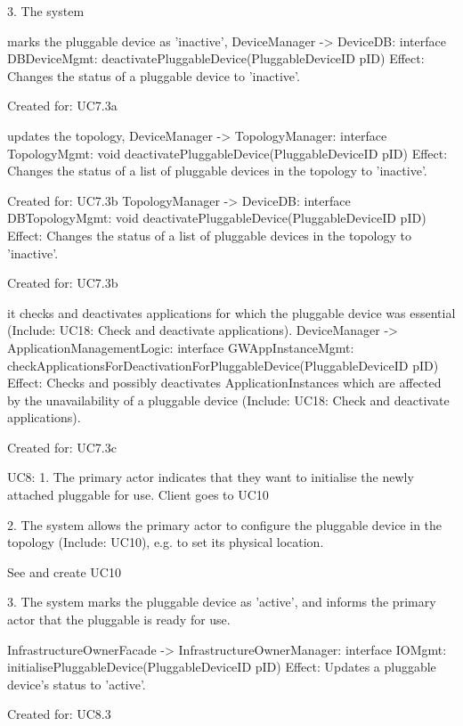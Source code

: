         3. The system
           { marks the pluggable device as 'inactive',
            DeviceManager -> DeviceDB: interface DBDeviceMgmt: deactivatePluggableDevice(PluggableDeviceID pID)
                Effect: Changes the status of a pluggable device to 'inactive'.
                \item Created for: UC7.3a

           { updates the topology,
            DeviceManager -> TopologyManager: interface TopologyMgmt: void deactivatePluggableDevice(PluggableDeviceID pID)
                Effect: Changes the status of a list of pluggable devices in the topology to 'inactive'.
                \item Created for: UC7.3b
            TopologyManager -> DeviceDB: interface DBTopologyMgmt: void deactivatePluggableDevice(PluggableDeviceID pID)
                Effect: Changes the status of a list of pluggable devices in the topology to 'inactive'.
                \item Created for: UC7.3b

           { it checks and deactivates applications for which the pluggable device was essential (Include: UC18: Check and deactivate applications).
            DeviceManager -> ApplicationManagementLogic: interface GWAppInstanceMgmt: checkApplicationsForDeactivationForPluggableDevice(PluggableDeviceID pID)
               Effect: Checks and possibly deactivates ApplicationInstances which are affected by the unavailability of a pluggable device (Include: UC18: Check and deactivate applications).
               \item Created for: UC7.3c


    UC8:
        1. The primary actor indicates that they want to initialise the newly attached pluggable for use.
            Client goes to UC10

        2. The system allows the primary actor to configure the pluggable device in the topology (Include: UC10), e.g. to set its physical location.

            See and create UC10

        3. The system marks the pluggable device as 'active', and informs the primary actor that the pluggable is ready for use.

            InfrastructureOwnerFacade -> InfrastructureOwnerManager: interface IOMgmt: initialisePluggableDevice(PluggableDeviceID pID)
                Effect: Updates a pluggable device's status to 'active'.
                \item Created for: UC8.3

}}}
